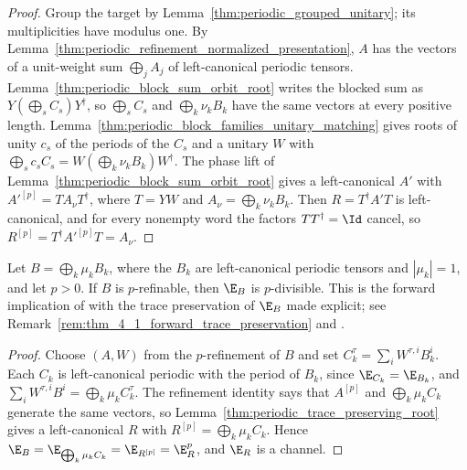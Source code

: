 \begin{proof}
    \leanok
    Group the target by Lemma~\ref{thm:periodic_grouped_unitary}; its
    multiplicities have modulus one. By
    Lemma~\ref{thm:periodic_refinement_normalized_presentation}, $A$ has
    the vectors of a unit-weight sum $\bigoplus_jA_j$ of left-canonical
    periodic tensors. Lemma~\ref{thm:periodic_block_sum_orbit_root} writes
    the blocked sum as $Y(\bigoplus_sC_s)Y^\dagger$, so $\bigoplus_sC_s$ and
    $\bigoplus_k\nu_kB_k$ have the same vectors at every positive length.
    Lemma~\ref{thm:periodic_block_families_unitary_matching} gives roots of
    unity $c_s$ of the periods of the $C_s$ and a unitary $W$ with
    $\bigoplus_sc_sC_s=W(\bigoplus_k\nu_kB_k)W^\dagger$. The phase lift of
    Lemma~\ref{thm:periodic_block_sum_orbit_root} gives a left-canonical
    $A'$ with $A'^{[p]}=TA_\nu T^\dagger$, where
    $T=YW$ and $A_\nu=\bigoplus_k\nu_kB_k$. Then $R=T^\dagger A'T$ is
    left-canonical, and for every nonempty word the factors $TT^\dagger=\Id$
    cancel, so $R^{[p]}=T^\dagger A'^{[p]}T=A_\nu$.
\end{proof}

\begin{theorem}
    \label{thm:thm_4_1_p_refinement_forward_unit_weights}
    \leanok
    Let $B=\bigoplus_k\mu_kB_k$, where the $B_k$ are left-canonical periodic
    tensors and $|\mu_k|=1$, and let $p>0$. If $B$ is $p$-refinable, then
    $\E_B$ is $p$-divisible. This is the forward implication of
    \cite[Theorem~4.1]{DeLasCuevas2017Irreducible} with the trace preservation
    of $\E_B$ made explicit; see
    Remark~\ref{rem:thm_4_1_forward_trace_preservation} and
    \cite{gap:dccsp17_thm41_forward_trace_preservation}.
\end{theorem}

\begin{proof}
    \leanok
    Choose $(A,W)$ from the $p$-refinement of $B$ and set $C_k^\tau=\sum_iW^{\tau,i}B_k^i$.
    Each $C_k$ is left-canonical periodic with the period of $B_k$, since
    $\E_{C_k}=\E_{B_k}$, and $\sum_iW^{\tau,i}B^i=\bigoplus_k\mu_kC_k^\tau$.
    The refinement identity says that $A^{[p]}$ and $\bigoplus_k\mu_kC_k$
    generate the same vectors, so
    Lemma~\ref{thm:periodic_trace_preserving_root} gives a left-canonical
    $R$ with $R^{[p]}=\bigoplus_k\mu_kC_k$. Hence
    $\E_B=\E_{\bigoplus_k\mu_kC_k}=\E_{R^{[p]}}=\E_R^p$, and $\E_R$ is a
    channel.
\end{proof}
